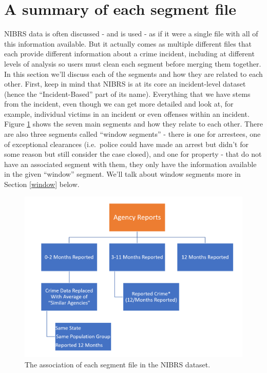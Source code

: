 \documentclass[
  12pt,
  openany]{book}
\begin{document}
\section{A summary of each segment file}\label{a-summary-of-each-segment-file}

NIBRS data is often discussed - and is used - as if it were a single file with all of this information available. But it actually comes as multiple different files that each provide different information about a crime incident, including at different levels of analysis so users must clean each segment before merging them together. In this section we'll discuss each of the segments and how they are related to each other. First, keep in mind that NIBRS is at its core an incident-level dataset (hence the ``Incident-Based'' part of its name). Everything that we have stems from the incident, even though we can get more detailed and look at, for example, individual victims in an incident or even offenses within an incident. Figure \ref{fig:segmentFlowchart} shows the seven main segments and how they relate to each other. There are also three segments called ``window segments'' - there is one for arrestees, one of exceptional clearances (i.e.~police could have made an arrest but didn't for some reason but still consider the case closed), and one for property - that do not have an associated segment with them, they only have the information available in the given ``window'' segment. We'll talk about window segments more in Section \ref{window} below.

\begin{figure}

{\centering \includegraphics[width=0.9\linewidth]{images/segments_flowchart} 

}

\caption{The association of each segment file in the NIBRS dataset.}\label{fig:segmentFlowchart}
\end{figure}
\end{document}
